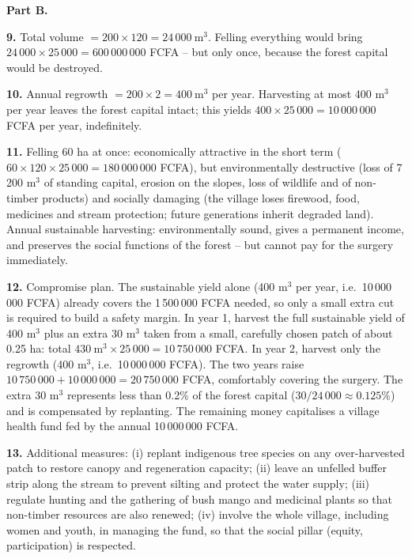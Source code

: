 \documentclass[11pt]{article}
\begin{document}
\textbf{Part B.}

\textbf{9.} Total volume $= 200 \times 120 = 24\,000\ \mathrm{m^3}$. Felling everything would bring $24\,000 \times 25\,000 = 600\,000\,000$ FCFA -- but only once, because the forest capital would be destroyed.

\textbf{10.} Annual regrowth $= 200 \times 2 = 400\ \mathrm{m^3}$ per year. Harvesting at most 400 m$^3$ per year leaves the forest capital intact; this yields $400 \times 25\,000 = 10\,000\,000$ FCFA per year, indefinitely.

\textbf{11.} Felling 60 ha at once: economically attractive in the short term ($60 \times 120 \times 25\,000 = 180\,000\,000$ FCFA), but environmentally destructive (loss of 7\,200 m$^3$ of standing capital, erosion on the slopes, loss of wildlife and of non-timber products) and socially damaging (the village loses firewood, food, medicines and stream protection; future generations inherit degraded land). Annual sustainable harvesting: environmentally sound, gives a permanent income, and preserves the social functions of the forest -- but cannot pay for the surgery immediately.

\textbf{12.} Compromise plan. The sustainable yield alone (400 m$^3$ per year, i.e.\ 10\,000\,000 FCFA) already covers the 1\,500\,000 FCFA needed, so only a small extra cut is required to build a safety margin. In year 1, harvest the full sustainable yield of 400 m$^3$ plus an extra 30 m$^3$ taken from a small, carefully chosen patch of about 0.25 ha: total $430\ \mathrm{m^3} \times 25\,000 = 10\,750\,000$ FCFA. In year 2, harvest only the regrowth (400 m$^3$, i.e.\ 10\,000\,000 FCFA). The two years raise $10\,750\,000 + 10\,000\,000 = 20\,750\,000$ FCFA, comfortably covering the surgery. The extra 30 m$^3$ represents less than 0.2\% of the forest capital ($30/24\,000 \approx 0.125\%$) and is compensated by replanting. The remaining money capitalises a village health fund fed by the annual 10\,000\,000 FCFA.

\textbf{13.} Additional measures: (i) replant indigenous tree species on any over-harvested patch to restore canopy and regeneration capacity; (ii) leave an unfelled buffer strip along the stream to prevent silting and protect the water supply; (iii) regulate hunting and the gathering of bush mango and medicinal plants so that non-timber resources are also renewed; (iv) involve the whole village, including women and youth, in managing the fund, so that the social pillar (equity, participation) is respected.
\end{document}
